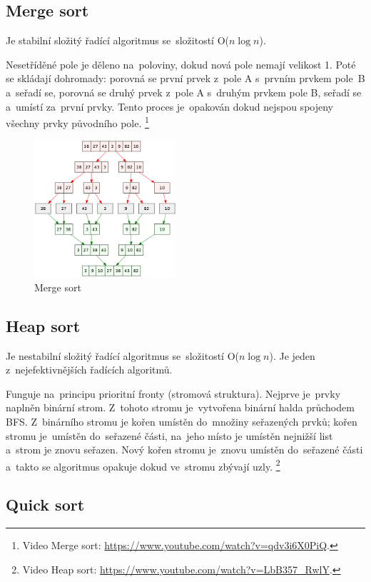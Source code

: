 \subsection{Merge sort}

Je stabilní složitý řadící algoritmus se~složitostí O($n\log{n}$).

Nesetříděné pole je děleno na~poloviny, dokud nová pole nemají velikost 1. Poté se skládají dohromady: porovná se první prvek z~pole A s~prvním prvkem pole~B a~seřadí se, porovná se druhý prvek z~pole A s~druhým prvkem pole B, seřadí se a~umístí za~první prvky. Tento proces je~opakován dokud nejspou spojeny všechny prvky původního pole.%
\footnote{Video Merge sort: \url{https://www.youtube.com/watch?v=qdv3i6X0PiQ}.}

\begin{figure}[ht]
	\centering
	\includegraphics[width=0.47\textwidth]{images/merge-sort}
	\caption{Merge sort}
\end{figure}

\subsection{Heap sort}

Je nestabilní složitý řadící algoritmus se~složitostí O($n\log{n}$). Je jeden z~nejefektivnějších řadících algoritmů.

Funguje na~principu prioritní fronty (stromová struktura). Nejprve je~prvky naplněn binární strom. Z~tohoto stromu je~vytvořena binární halda průchodem BFS. Z~binárního stromu je kořen umístěn do~množiny seřazených prvků; kořen stromu je~umístěn do~seřazené části, na~jeho místo je umístěn nejnižší list a~strom je znovu seřazen. Nový kořen stromu je~znovu umístěn do~seřazené části a~takto se algoritmus opakuje dokud ve~stromu zbývají uzly.%
\footnote{Video Heap sort: \url{https://www.youtube.com/watch?v=LbB357_RwlY}.}

\subsection{Quick sort}

